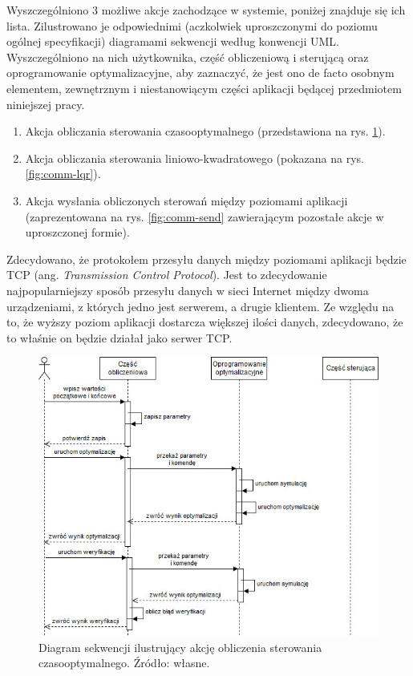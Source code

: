Wyszczególniono 3 możliwe akcje zachodzące w systemie, poniżej znajduje się ich lista. Zilustrowano je odpowiednimi (aczkolwiek uproszczonymi do poziomu ogólnej specyfikacji) diagramami sekwencji według konwencji UML. Wyszczególniono na nich użytkownika, część obliczeniową i sterującą oraz oprogramowanie optymalizacyjne, aby zaznaczyć, że jest ono de facto osobnym elementem, zewnętrznym i niestanowiącym części aplikacji będącej przedmiotem niniejszej pracy.

\begin{enumerate}
    \item Akcja obliczania sterowania czasooptymalnego (przedstawiona na rys. \ref{fig:comm-toc}).
    \item Akcja obliczania sterowania liniowo-kwadratowego (pokazana na rys. \ref{fig:comm-lqr}).
    \item Akcja wysłania obliczonych sterowań między poziomami aplikacji (zaprezentowana na rys. \ref{fig:comm-send} zawierającym pozostałe akcje w uproszczonej formie).
\end{enumerate}

Zdecydowano, że protokołem przesyłu danych między poziomami aplikacji będzie TCP (ang. \emph{Transmission Control Protocol}). Jest to zdecydowanie najpopularniejszy sposób przesyłu danych w sieci Internet między dwoma urządzeniami, z których jedno jest serwerem, a drugie klientem. Ze względu na to, że wyższy poziom aplikacji dostarcza większej ilości danych, zdecydowano, że to właśnie on będzie działał jako serwer TCP.

\begin{figure}[hpt]
    \centering
    \includegraphics[width=\textwidth]{Grafika/communication-toc}
    \caption{Diagram sekwencji ilustrujący akcję obliczenia sterowania czasooptymalnego. Źródło: własne.}\label{fig:comm-toc}
\end{figure}

